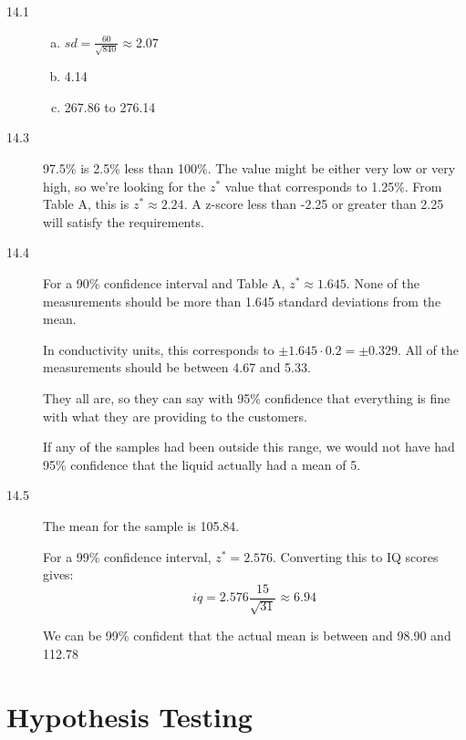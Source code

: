 \documentclass[landscape]{exam}
\begin{document}
  \begin{description}
    \item[14.1] 
      \begin{enumerate}[(a)]

        \item $ sd = \frac{60}{\sqrt{840}} \approx 2.07$

        \item 4.14

        \item 267.86 to 276.14

      \end{enumerate}

    \item[14.3] 97.5\% is 2.5\% less than 100\%. The value might be either very low
      or very high, so we're looking for the $z^*$ value that corresponds to
      1.25\%. From Table A, this is $z^* \approx 2.24$. A z-score less than
      -2.25 or greater than 2.25 will satisfy the requirements.

    \item[14.4]
      For a 90\% confidence interval and Table A, $z^* \approx 1.645$. None of
      the measurements should be more than 1.645 standard deviations from the
      mean.

      In conductivity units, this corresponds to $\pm 1.645 \cdot 0.2 = \pm
      0.329$. All of the measurements should be between 4.67 and 5.33.

      They all are, so they can say with 95\% confidence that everything is
      fine with what they are providing to the customers.

      If any of the samples had been outside this range, we would not have had
      95\% confidence that the liquid actually had a mean of 5.

    \item[14.5]
      The mean for the sample is 105.84. 

      For a 99\% confidence interval, $z^* = 2.576$. Converting this to IQ
      scores gives:
      \[
        iq = 2.576 \frac{15}{\sqrt{31}} \approx 6.94
      \]

      We can be 99\% confident that the actual mean is between and 98.90 and 112.78

    \end{description}

  \section{Hypothesis Testing}
\end{document}
